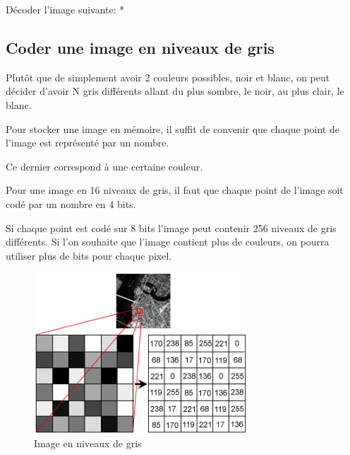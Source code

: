 \documentclass[11pt, a4paper]{book}
\begin{document}
\begin{exercice}
Décoder l'image suivante: *

\begin{center}
\end{center}
\end{exercice}


\subsection{Coder une image en niveaux de gris}

Plutôt que de simplement avoir 2 couleurs possibles, noir et blanc, on peut décider d'avoir N gris différents allant du plus sombre, le noir, au plus clair, le blanc.

Pour stocker une image en mémoire, il suffit de convenir que chaque point de l’image est représenté par un nombre. 

Ce dernier correspond à une certaine couleur.

Pour une image en 16 niveaux de gris, il faut que chaque point de l’image soit codé par un nombre en 4 bits.

Si chaque point est codé sur 8 bits l’image peut contenir 256 niveaux de gris différents. Si l'on souhaite que l'image contient plus de couleurs, on pourra utiliser plus de bits pour chaque pixel.


\begin{center}
\begin{figure}[H]
\centering
\includegraphics[width=8cm]{images/grayscale}
\caption{Image en niveaux de gris}
\end{figure}
\end{center}
\end{document}
